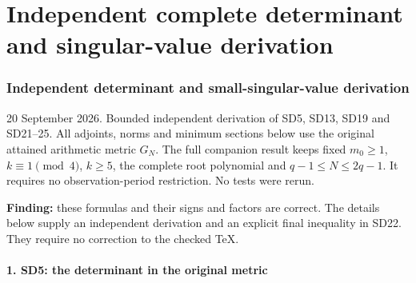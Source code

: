 \documentclass[11pt]{article}
\begin{document}
\endgroup

\clearpage\begingroup
\part*{Independent complete determinant and singular-value derivation}
\providecommand{\osdindtightlist}{\setlength{\itemsep}{0pt}\setlength{\parskip}{0pt}}

\section{Independent determinant and small-singular-value derivation}\label{osdind:independent-determinant-and-small-singular-value-derivation}

20 September 2026. Bounded independent derivation of SD5, SD13, SD19 and SD21--25. All adjoints, norms and minimum sections below use the original attained arithmetic metric \(G_N\). The full companion result keeps fixed \(m_0\ge1\), \(k\equiv1\pmod4\), \(k\ge5\), the complete root polynomial and \(q-1\le N\le2q-1\). It requires no observation-period restriction. No tests were rerun.

\textbf{Finding:} these formulas and their signs and factors are correct. The details below supply an independent derivation and an explicit final inequality in SD22. They require no correction to the checked TeX.

\subsection{1. SD5: the determinant in the original metric}\label{osdind:sd5-the-determinant-in-the-original-metric}
\end{document}
